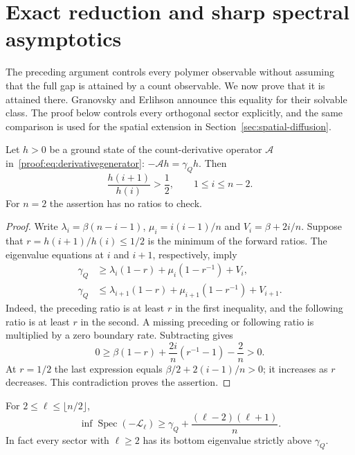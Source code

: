 \section{Exact reduction and sharp spectral asymptotics}
\label{sec:exact-spectrum}

The preceding argument controls every polymer observable without assuming
that the full gap is attained by a count observable. We now prove that it
is attained there. Granovsky and Erlihson
\cite[Section~2.3]{GranovskyErlihson2009} announce this equality for
their solvable class. The proof below controls every orthogonal sector
explicitly, and the same comparison is used for the spatial extension
in Section~\ref{sec:spatial-diffusion}.

\begin{lemma}\label{lem:ground-ratio}
Let $h>0$ be a ground state of the count-derivative operator
$\mathcal A$ in~\eqref{proof:eq:derivativegenerator}:
$-\mathcal Ah=\gamma_Qh$. Then
\[
 \frac{h(i+1)}{h(i)}>\frac12,\qquad 1\le i\le n-2.
\]
For $n=2$ the assertion has no ratios to check.
\end{lemma}

\begin{proof}
Write $\lambda_i=\beta(n-i-1)$, $\mu_i=i(i-1)/n$ and
$V_i=\beta+2i/n$. Suppose that $r=h(i+1)/h(i)\le1/2$ is the
minimum of the forward ratios. The eigenvalue equations at $i$ and
$i+1$, respectively, imply
\begin{align*}
 \gamma_Q&\ge\lambda_i(1-r)+\mu_i(1-r^{-1})+V_i,\\
 \gamma_Q&\le\lambda_{i+1}(1-r)+\mu_{i+1}(1-r^{-1})+V_{i+1}.
\end{align*}
Indeed, the preceding ratio is at least $r$ in the first inequality,
and the following ratio is at least $r$ in the second. A missing
preceding or following ratio is multiplied by a zero boundary rate.
Subtracting gives
\[
 0\ge\beta(1-r)+\frac{2i}{n}(r^{-1}-1)-\frac2n>0.
\]
At $r=1/2$ the last expression equals $\beta/2+2(i-1)/n>0$;
it increases as $r$ decreases. This contradiction
proves the assertion.
\end{proof}

\begin{proposition}
\label{prop:higher-exact}
For $2\le\ell\le\lfloor n/2\rfloor$,
\[
 \inf\operatorname{Spec}(-\mathcal L_\ell)
 \ge\gamma_Q+\frac{(\ell-2)(\ell+1)}n.
\]
In fact every sector with $\ell\ge2$ has its bottom eigenvalue
strictly above $\gamma_Q$.
\end{proposition}

